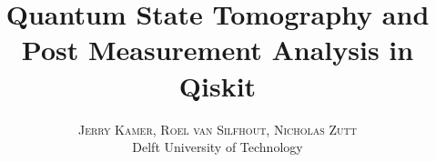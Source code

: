 \documentclass[twoside,twocolumn]{article}
\title{\textbf{Quantum State Tomography and Post Measurement Analysis in
Qiskit}} %
\author{%
\textsc{Jerry Kamer, Roel van Silfhout, Nicholas Zutt}
\\[1ex]
\normalsize{Delft University of Technology}\\ %
}
\date{} %
\begin{document}
	\maketitle














\printbibliography



\appendix


\label{apen} %
\clearpage





\end{document}
